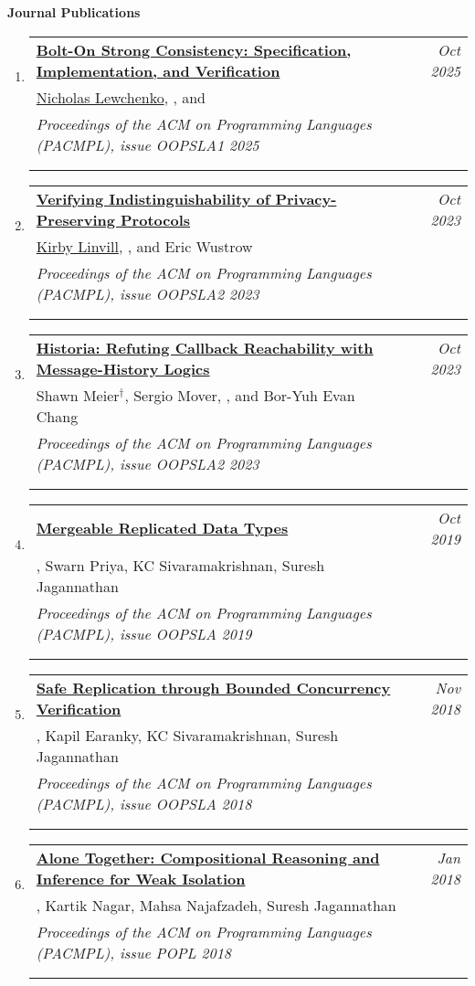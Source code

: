 \documentclass{article}
\makeatletter
\newenvironment{benumerate}[2]{
    \let\oldItem\item
    \def\item{\addtocounter{enumi}{-2}\oldItem}
    \begin{enumerate}[#2] \itemsep3pt
    \setcounter{enumi}{#1}
    \addtocounter{enumi}{1}}
  {\end{enumerate}}
\newenvironment{region}[3]{%
  {{\textbf{#1}}}
  \begin{benumerate}{#3}{\color{RoyalBlue}#2}}
  {\end{benumerate}\vspace{0.8ex}}
\newenvironment{publication}[6]
{ \item
  \begin{tabular*}{6.8in}{p{6in}@{\extracolsep{\fill}}r}
    \href{#1}{\textbf{#2}} & \textit{#3}\\ #4 &\\ \textit{#5}&\\
    \ifthenelse{\equal{#6}{}}{}{#6&\\}
  \end{tabular*}
} {}
\makeatother
\begin{document}
\begin{region} {Journal Publications}{{J}1}{7}

\begin{publication}{https://dl.acm.org/doi/10.1145/3720502}
		{Bolt-On Strong Consistency: Specification, Implementation, and Verification}
    {Oct 2025}{\underline{Nicholas Lewchenko}, \ugkaki, and \bec}
    {Proceedings of the ACM on Programming Languages (PACMPL), issue OOPSLA1
    2025}
    {Article No.: 137; Pages: 1604 - 1631; Acceptance rate: 32\%}
\end{publication}

\begin{publication}{https://gowthamk.github.io/docs/oopsla23a.pdf}
		{Verifying Indistinguishability of Privacy-Preserving Protocols } {Oct
    2023}{\underline{Kirby Linvill}, \ugkaki, and Eric Wustrow}
    {Proceedings of the ACM on Programming Languages (PACMPL), issue
    OOPSLA2 2023} 
    {Article No.: 273; Pages 1442 - 1469; Acceptance rate: 38\%}
\end{publication}

\begin{publication}{https://gowthamk.github.io/docs/oopsla23b.pdf}
		{Historia: Refuting Callback Reachability with Message-History Logics}
    {Oct 2023}{Shawn Meier$^\dag$, Sergio Mover, \ugkaki, and Bor-Yuh Evan Chang}
    {Proceedings of the ACM on Programming Languages (PACMPL), issue OOPSLA2
    2023}
    {Article No.: 289; Pages 1905 - 1934; Acceptance rate: 38\%}
\end{publication}

\begin{publication}{https://gowthamk.github.io/docs/mrdt.pdf}
		{Mergeable Replicated Data Types}
    {Oct 2019}{\ugkaki, Swarn Priya, KC Sivaramakrishnan, Suresh Jagannathan}
    {Proceedings of the ACM on Programming Languages (PACMPL), issue OOPSLA
    2019}
    {Article No.: 154; Pages 1 - 29; Acceptance rate: 36\%}
  \end{publication}

	\begin{publication}{https://gowthamk.github.io/docs/q9.pdf}
		{Safe Replication through Bounded Concurrency Verification}
    {Nov 2018}{\ugkaki, Kapil Earanky, KC Sivaramakrishnan, Suresh Jagannathan}
    {Proceedings of the ACM on Programming Languages (PACMPL), issue OOPSLA
    2018}
    {Article No.: 164; Pages 1 - 27; Acceptance rate: 28\%}
  \end{publication}

  \begin{publication}{https://gowthamk.github.io/docs/popl18.pdf}
    {Alone Together: Compositional Reasoning and Inference for Weak Isolation}
    {Jan 2018}
    {\ugkaki, Kartik Nagar, Mahsa Najafzadeh, Suresh Jagannathan}
    {Proceedings of the ACM on Programming Languages (PACMPL), issue POPL
    2018}
    {Article No.: 27; Pages 1 - 34; Acceptance rate: 24\%}
  \end{publication}


\end{region}
\end{document}
